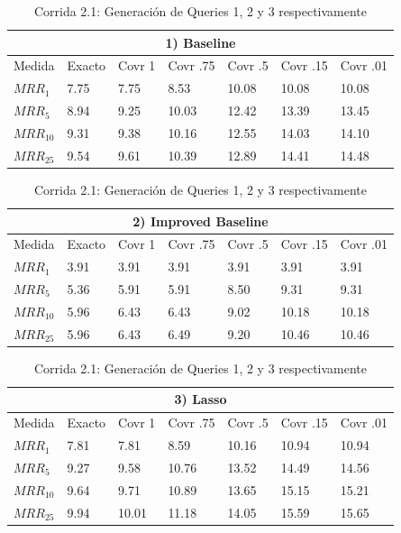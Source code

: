 \begin{table}
\centering
\begin{center}
\begin{tabular}{|l | l | l | l | l | l | l |}
\hline
\multicolumn{7}{|c|}{1) Baseline}  \\ \hline
Medida & Exacto & Covr 1 & Covr .75 & Covr .5 & Covr .15 & Covr .01 \\ \hline

$MRR_{1}$ & 7.75 & 7.75 & 8.53 & 10.08 & 10.08 & 10.08  \\ \hline
$MRR_{5}$ & 8.94 & 9.25 & 10.03 & 12.42 & 13.39 & 13.45  \\ \hline
$MRR_{10}$ & 9.31 & 9.38 & 10.16 & 12.55 & 14.03 & 14.10  \\ \hline
$MRR_{25}$ & 9.54 & 9.61 & 10.39 & 12.89 & 14.41 & 14.48  \\ \hline
\end{tabular}

\medskip

\begin{tabular}{|l | l | l | l | l | l | l |}
\hline
\multicolumn{7}{|c|}{2) Improved Baseline}  \\ \hline
Medida & Exacto & Covr 1 & Covr .75 & Covr .5 & Covr .15 & Covr .01 \\ \hline

$MRR_{1}$ & 3.91 & 3.91 & 3.91 & 3.91 & 3.91 & 3.91  \\ \hline
$MRR_{5}$ & 5.36 & 5.91 & 5.91 & 8.50 & 9.31 & 9.31  \\ \hline
$MRR_{10}$ & 5.96 & 6.43 & 6.43 & 9.02 & 10.18 & 10.18  \\ \hline
$MRR_{25}$ & 5.96 & 6.43 & 6.49 & 9.20 & 10.46 & 10.46  \\ \hline
\end{tabular}


\medskip

\begin{tabular}{|l | l | l | l | l | l | l |}
\hline
\multicolumn{7}{|c|}{3) Lasso}  \\ \hline
Medida & Exacto & Covr 1 & Covr .75 & Covr .5 & Covr .15 & Covr .01 \\ \hline

$MRR_{1}$ & 7.81 & 7.81 & 8.59 & 10.16 & 10.94 & 10.94  \\ \hline
$MRR_{5}$ & 9.27 & 9.58 & 10.76 & 13.52 & 14.49 & 14.56  \\ \hline
$MRR_{10}$ & 9.64 & 9.71 & 10.89 & 13.65 & 15.15 & 15.21  \\ \hline
$MRR_{25}$ & 9.94 & 10.01 & 11.18 & 14.05 & 15.59 & 15.65  \\ \hline
\end{tabular}

\caption{Corrida 2.1: Generación de Queries 1, 2 y 3 respectivamente}
\label{table:2_1_50_40_getExactMRRWikiFactoid_getCovrMRRWikiFactoidx}
\end{center}
\end{table}

